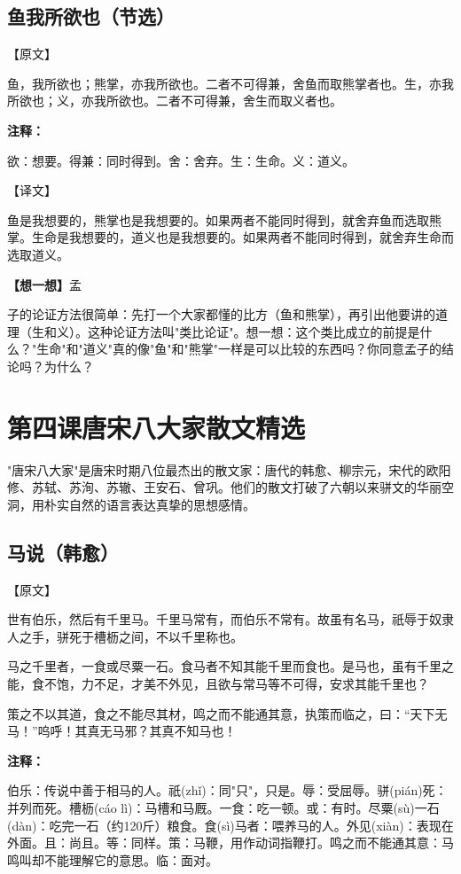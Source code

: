 \documentclass[a4paper,12pt]{ctexart}
\newcommand{\annlist}[1]{{\vspace{0.15cm}\noindent\textcolor{orange!80!black}{\small\bfseries 注释：}\par\footnotesize #1\par}}
\newcommand{\thinkq}[1]{\vspace{0.2cm}\noindent\textcolor{orange!60!black}{\small\bfseries【想一想】}{\small #1}\par}
\begin{document}
\subsection*{鱼我所欲也（节选）}

\noindent\textcolor{blue!70!black}{\large【原文】}

鱼，我所欲也；熊掌，亦我所欲也。二者不可得兼，舍鱼而取熊掌者也。生，亦我所欲也；义，亦我所欲也。二者不可得兼，舍生而取义者也。

\annlist{欲：想要。得兼：同时得到。舍：舍弃。生：生命。义：道义。}

\noindent\textcolor{green!60!black}{\large【译文】}

鱼是我想要的，熊掌也是我想要的。如果两者不能同时得到，就舍弃鱼而选取熊掌。生命是我想要的，道义也是我想要的。如果两者不能同时得到，就舍弃生命而选取道义。

\thinkq 孟子的论证方法很简单：先打一个大家都懂的比方（鱼和熊掌），再引出他要讲的道理（生和义）。这种论证方法叫"类比论证"。想一想：这个类比成立的前提是什么？"生命"和"道义"真的像"鱼"和"熊掌"一样是可以比较的东西吗？你同意孟子的结论吗？为什么？

\newpage

\section{\textcolor{orange!80!black}{第四课\quad 唐宋八大家散文精选}}

"唐宋八大家"是唐宋时期八位最杰出的散文家：唐代的韩愈、柳宗元，宋代的欧阳修、苏轼、苏洵、苏辙、王安石、曾巩。他们的散文打破了六朝以来骈文的华丽空洞，用朴实自然的语言表达真挚的思想感情。

\subsection*{马说（韩愈）}

\noindent\textcolor{blue!70!black}{\large【原文】}

世有伯乐，然后有千里马。千里马常有，而伯乐不常有。故虽有名马，祇辱于奴隶人之手，骈死于槽枥之间，不以千里称也。

马之千里者，一食或尽粟一石。食马者不知其能千里而食也。是马也，虽有千里之能，食不饱，力不足，才美不外见，且欲与常马等不可得，安求其能千里也？

策之不以其道，食之不能尽其材，鸣之而不能通其意，执策而临之，曰：\textquotedblleft 天下无马！\textquotedblright 呜呼！其真无马邪？其真不知马也！

\annlist{伯乐：传说中善于相马的人。祇(zhǐ)：同"只"，只是。辱：受屈辱。骈(pián)死：并列而死。槽枥(cáo lì)：马槽和马厩。一食：吃一顿。或：有时。尽粟(sù)一石(dàn)：吃完一石（约120斤）粮食。食(sì)马者：喂养马的人。外见(xiàn)：表现在外面。且：尚且。等：同样。策：马鞭，用作动词指鞭打。鸣之而不能通其意：马鸣叫却不能理解它的意思。临：面对。}
\end{document}
